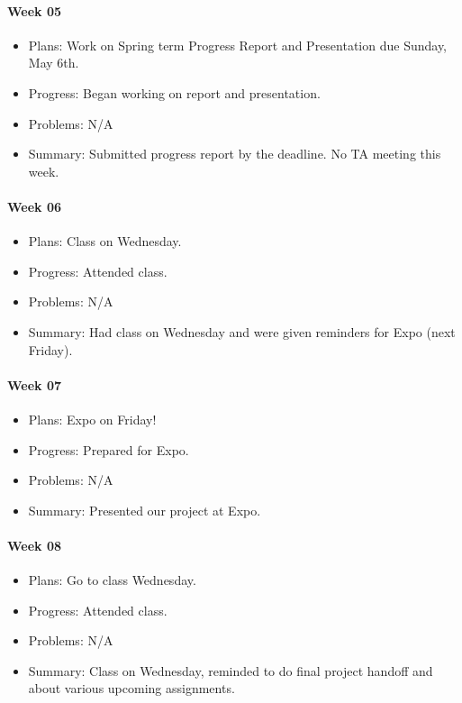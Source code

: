 \paragraph{Week 05}
\begin{itemize}
\item Plans: Work on Spring term Progress Report and Presentation due Sunday, May 6th.
\item Progress: Began working on report and presentation.
\item Problems: N/A
\item Summary: Submitted progress report by the deadline. 
No TA meeting this week.
\end{itemize}
\paragraph{Week 06}
\begin{itemize}
\item Plans: Class on Wednesday.
\item Progress: Attended class.
\item Problems: N/A
\item Summary: Had class on Wednesday and were given reminders for Expo (next Friday).
\end{itemize}
\paragraph{Week 07}
\begin{itemize}
\item Plans: Expo on Friday!
\item Progress: Prepared for Expo.
\item Problems: N/A
\item Summary: Presented our project at Expo.
\end{itemize}
\paragraph{Week 08}
\begin{itemize}
\item Plans: Go to class Wednesday.
\item Progress: Attended class.
\item Problems: N/A
\item Summary: Class on Wednesday, reminded to do final project handoff and about various upcoming assignments.
\end{itemize}
